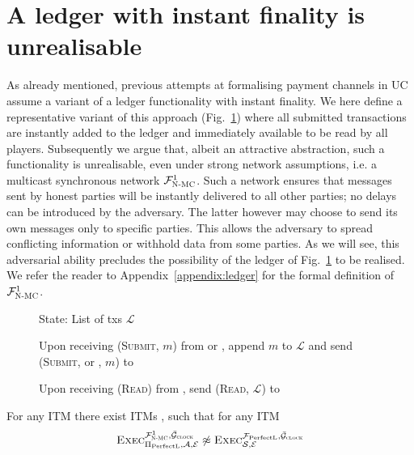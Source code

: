 \section{A ledger with instant finality is unrealisable}
\label{sec:perfect-ledger}
  As already mentioned, previous attempts at formalising payment channels in
  UC~\cite{DBLP:conf/ccs/DziembowskiFH18,perun,Malavolta:2017:CPP:3133956.3134096,sprites}
  assume a variant of a ledger functionality with instant finality. We here
  define a representative variant of this approach \perfectledger{}
  (Fig.~\ref{fig:perfectledger:func}) where all submitted transactions are
  instantly added to the ledger and immediately available to be read by all
  players. Subsequently we argue that, albeit an attractive abstraction, such a
  functionality is unrealisable, even under strong network assumptions, i.e. a
  multicast synchronous network $\mathcal{F}_{\textsc{N-MC}}^1$.
  Such a network ensures that messages sent by honest parties will be instantly
  delivered to all other parties; no delays can be introduced by the adversary.
  The latter however may choose to send its own messages only to specific
  parties. This allows the adversary to spread conflicting information or
  withhold data from some parties. As we will see, this adversarial ability
  precludes the possibility of the ledger of Fig.~\ref{fig:perfectledger:func}
  to be realised. We refer the reader to Appendix~\ref{appendix:ledger} for the
  formal definition of $\mathcal{F}_{\textsc{N-MC}}^1$.

  \begin{figure}[H]
    \begin{systembox}{\perfectledger}
      \begin{algorithmic}[1]
        \State State: List of txs $\mathcal{L}$
        \Statex

        \State Upon receiving (\textsc{Submit}, $m$) from \alice or \adversary,
        append $m$ to $\mathcal{L}$ and send (\textsc{Submit}, \alice or
        \adversary, $m$) to \adversary
        \Statex

        \State Upon receiving (\textsc{Read}) from \alice, send (\textsc{Read},
        $\mathcal{L}$) to \alice
      \end{algorithmic}
    \end{systembox}
    \caption{}
    \label{fig:perfectledger:func}
  \end{figure}

  \begin{theorem}
    \label{theorem:perfectledger}
    For any ITM \perfectprot{} there exist ITMs \perfectenv,
    \perfectadv{} such that for any ITM \simulator
    \begin{equation*}
      \textsc{Exec}^{\mathcal{F}_{\textsc{N-MC}}^1, \bar{\mathcal{G}}_{\textsc{clock}}}_{\Pi_{\mathrm{PerfectL}}, \mathcal{A},
      \mathcal{E}} \not\approx \textsc{Exec}^{\mathcal{F}_{\mathrm{PerfectL}},
      \bar{\mathcal{G}}_{\textsc{clock}}}_{\mathcal{S}, \mathcal{E}}
    \end{equation*}
  \end{theorem}

